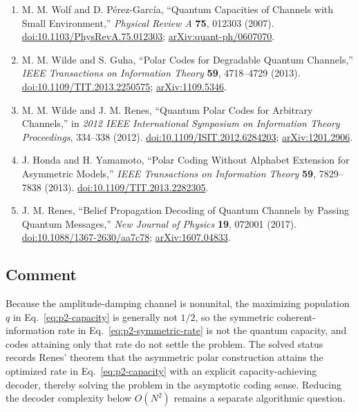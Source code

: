 \begin{enumerate}[label={},leftmargin=4.8em,labelsep=0.5em]
  \footnotesize
  \item[\textup{[WPG07]}]\label{ref:p2-wolf}
  M. M. Wolf and D. P\'erez-Garc\'ia, ``Quantum Capacities of Channels with
  Small Environment,'' \emph{Physical Review A} \textbf{75}, 012303 (2007).
  \href{https://doi.org/10.1103/PhysRevA.75.012303}{doi:10.1103/PhysRevA.75.012303};
  \href{https://arxiv.org/abs/quant-ph/0607070}{arXiv:quant-ph/0607070}.

  \item[\textup{[WG13]}]\label{ref:p2-wilde-guha}
  M. M. Wilde and S. Guha, ``Polar Codes for Degradable Quantum Channels,''
  \emph{IEEE Transactions on Information Theory} \textbf{59}, 4718--4729
  (2013). \href{https://doi.org/10.1109/TIT.2013.2250575}{doi:10.1109/TIT.2013.2250575};
  \href{https://arxiv.org/abs/1109.5346}{arXiv:1109.5346}.

  \item[\textup{[WR12]}]\label{ref:p2-wilde-renes}
  M. M. Wilde and J. M. Renes, ``Quantum Polar Codes for Arbitrary Channels,''
  in \emph{2012 IEEE International Symposium on Information Theory
  Proceedings}, 334--338 (2012).
  \href{https://doi.org/10.1109/ISIT.2012.6284203}{doi:10.1109/ISIT.2012.6284203};
  \href{https://arxiv.org/abs/1201.2906}{arXiv:1201.2906}.

  \item[\textup{[HY13]}]\label{ref:p2-honda-yamamoto}
  J. Honda and H. Yamamoto, ``Polar Coding Without Alphabet Extension for
  Asymmetric Models,'' \emph{IEEE Transactions on Information Theory}
  \textbf{59}, 7829--7838 (2013).
  \href{https://doi.org/10.1109/TIT.2013.2282305}{doi:10.1109/TIT.2013.2282305}.

  \item[\textup{[Ren17]}]\label{ref:p2-renes-belief-propagation}
  J. M. Renes, ``Belief Propagation Decoding of Quantum Channels by Passing
  Quantum Messages,'' \emph{New Journal of Physics} \textbf{19}, 072001
  (2017). \href{https://doi.org/10.1088/1367-2630/aa7c78}{doi:10.1088/1367-2630/aa7c78};
  \href{https://arxiv.org/abs/1607.04833}{arXiv:1607.04833}.
\end{enumerate}

\subsection*{Comment}

Because the amplitude-damping channel is nonunital, the maximizing population
$q$ in Eq.~\eqref{eq:p2-capacity} is generally not $1/2$, so the symmetric
coherent-information rate in Eq.~\eqref{eq:p2-symmetric-rate} is not the
quantum capacity, and codes attaining only that rate do not settle the
problem.  The solved status records Renes' theorem that the asymmetric polar
construction attains the optimized rate in Eq.~\eqref{eq:p2-capacity} with
an explicit capacity-achieving decoder, thereby solving the problem in the
asymptotic coding sense.  Reducing the decoder complexity below $O(N^2)$
remains a separate algorithmic question.

